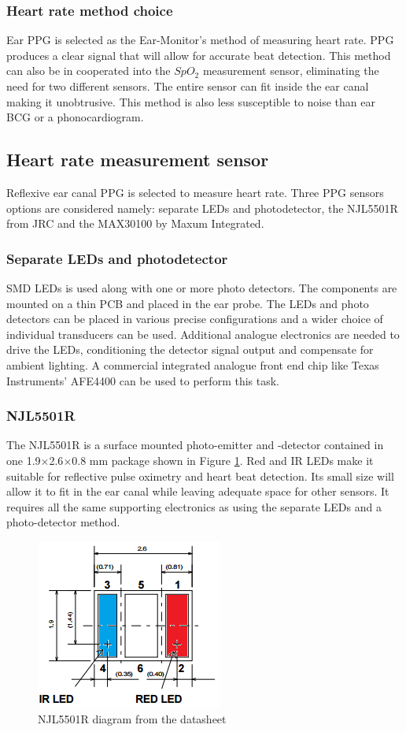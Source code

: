 \subsubsection{Heart rate method choice}
Ear PPG is selected as the Ear-Monitor's method of measuring heart rate. PPG produces a clear signal that will allow for accurate beat detection. This method can also be in cooperated into the $SpO_2$ measurement sensor, eliminating the need for two different sensors. The entire sensor can fit inside the ear canal making it unobtrusive. This method is also less susceptible to noise than ear BCG or a phonocardiogram.

\subsection{Heart rate measurement sensor}
Reflexive ear canal PPG is selected to measure heart rate. Three PPG sensors options are considered namely: separate LEDs and photodetector, the NJL5501R from JRC and the MAX30100 by Maxum Integrated.

\subsubsection{Separate LEDs and photodetector}
SMD LEDs is used along with one or more photo detectors. The components are mounted on a thin PCB and placed in the ear probe. The LEDs and photo detectors can be placed in various precise configurations and a wider choice of individual transducers can be used. Additional analogue electronics are needed to drive the LEDs, conditioning the detector signal output and compensate for ambient lighting. A commercial integrated analogue front end chip like Texas Instruments' AFE4400 can be used to perform this task.

\subsubsection{NJL5501R}
The NJL5501R is a surface mounted photo-emitter and -detector contained in one 1.9$\times$2.6$\times$0.8 mm package shown in Figure \ref{fig:NJL5501R}. Red and IR LEDs make it suitable for reflective pulse oximetry and heart beat detection. Its small size will allow it to fit in the ear canal while leaving adequate space for other sensors. It requires all the same supporting electronics as using the separate LEDs and a photo-detector method.

 \begin{figure}[h]
   \centering
   \includegraphics[scale=1]{figs/NJL5501R.png}
   \caption{NJL5501R diagram from the datasheet}
   \label{fig:NJL5501R}
\end{figure}

